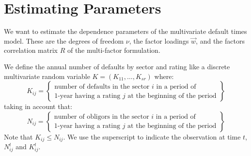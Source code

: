 \documentclass[11pt,fleqn]{book} %
\begin{document}
\chapter{Estimating Parameters}
\label{chap:estimation}

We want to estimate the dependence parameters of the multivariate default 
times model. These are the degrees of freedom $\nu$, the factor loadings 
$\vec{w}$, and the factors correlation matrix $R$ of the multi-factor 
formulation.

\begin{definition}
	We define the annual number of defaults by sector and rating like a
	discrete multivariate random variable $K=(K_{11}, \dots, K_{sr})$ where:
	\begin{displaymath}
		K_{ij} = \left\{
		\begin{array}{c}
			\text{number of defaults in the sector $i$ in a period of} \\
			\text{1-year having a rating $j$ at the beginning of the period}
		\end{array}
		\right\}
	\end{displaymath}
	taking in account that:
	\begin{displaymath}
		N_{ij} = \left\{
		\begin{array}{c}
			\text{number of obligors in the sector $i$ in a period of} \\
			\text{1-year having a rating $j$ at the beginning of the period}
		\end{array}
		\right\}
	\end{displaymath}
	Note that $K_{ij} \le N_{ij}$. We use the superscript to indicate 
	the observation at time $t$, $N_{ij}^t$ and $K_{ij}^t$. 
\end{definition}
\end{document}
